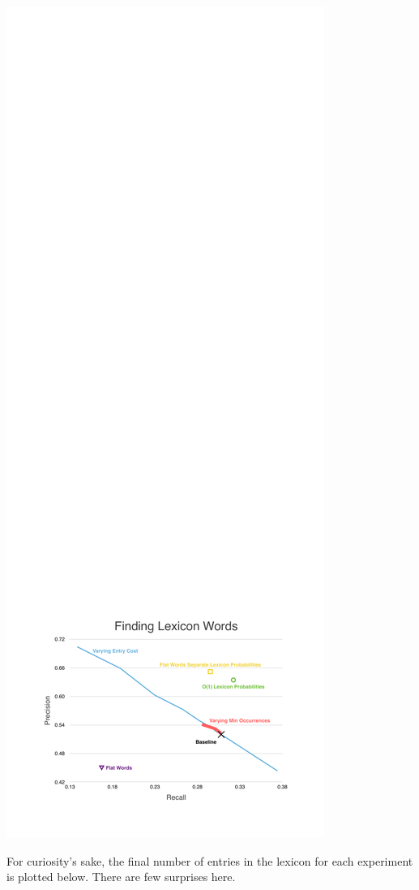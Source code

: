 \documentclass[11pt, oneside, fleqn]{article}
\begin{document}
  \includegraphics{./figure/finding_lexiocn_words.pdf}

	For curiosity's sake, the final number of entries in the lexicon for each experiment is plotted below. There are few surprises here.
\end{document}
